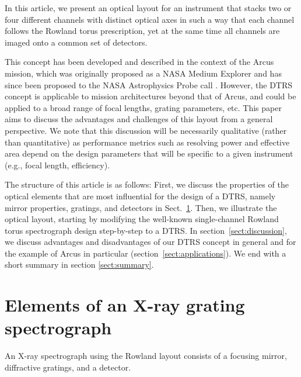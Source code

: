 \documentclass[twocolumn]{aastex631}
\begin{document}
In this article, we present an optical layout for an instrument that stacks two or four different channels with distinct optical axes in such a way that each channel follows the Rowland torus prescription, yet at the same time all channels are imaged onto a common set of detectors.


This concept has been developed and described in the context of the Arcus mission, which was originally proposed as a NASA Medium Explorer \citep{2019SPIE11118E..0WS} and  has since been proposed to the NASA Astrophysics Probe call \citep{2023SPIE12678E..0ES}. However, the DTRS concept is applicable to mission architectures beyond that of Arcus, and could be applied to a broad range of focal lengths, grating parameters, etc. This paper aims to discuss the advantages and challenges of this layout from a general perspective. We note that this discussion will be necessarily qualitative (rather than quantitative) as performance metrics such as resolving power and effective area depend on the design parameters that will be specific to a given instrument (e.g., focal length, efficiency).

The structure of this article is as follows: First, we discuss the properties of the optical elements that are most influential for the design of a DTRS, namely mirror properties, gratings, and detectors in Sect.~\ref{sect:elements}. Then, we illustrate the optical layout, starting by modifying the well-known single-channel Rowland torus spectrograph design step-by-step to a DTRS. In section~\ref{sect:discussion}, we discuss advantages and disadvantages of our DTRS concept in general and for the example of Arcus in particular (section~\ref{sect:applications}). We end with a short summary in section \ref{sect:summary}.

\section{Elements of an X-ray grating spectrograph}
\label{sect:elements}
An X-ray spectrograph using the Rowland layout consists of a focusing mirror, diffractive gratings, and a detector.
\end{document}
